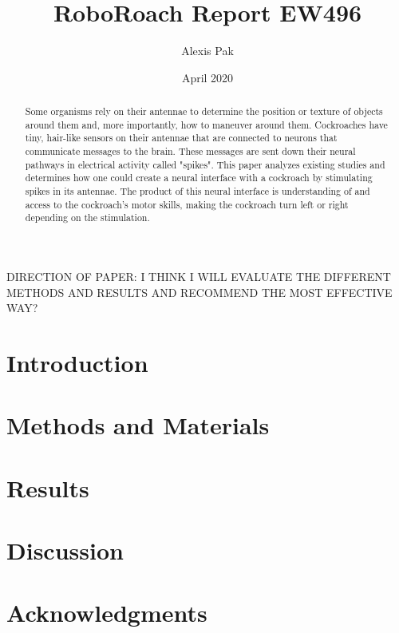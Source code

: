 \documentclass{article}
\title{RoboRoach Report EW496}
\author{Alexis Pak}
\date{April 2020}
\begin{document}
\maketitle
\begin{abstract}
Some organisms rely on their antennae to determine the position or texture of objects around them and, more importantly, how to maneuver around them. Cockroaches have tiny, hair-like sensors on their antennae that are connected to neurons that communicate messages to the brain. These messages are sent down their neural pathways in electrical activity called "spikes". This paper analyzes existing studies and determines how one could create a neural interface with a cockroach by stimulating spikes in its antennae. The product of this neural interface is understanding of and access to the cockroach's motor skills, making the cockroach turn left or right depending on the stimulation. 
\end{abstract}

DIRECTION OF PAPER: I THINK I WILL EVALUATE THE DIFFERENT METHODS AND RESULTS AND RECOMMEND THE MOST EFFECTIVE WAY?


\section{Introduction}
\section{Methods and Materials}
\section{Results}
\section{Discussion}
\section{Acknowledgments}

\end{document}
